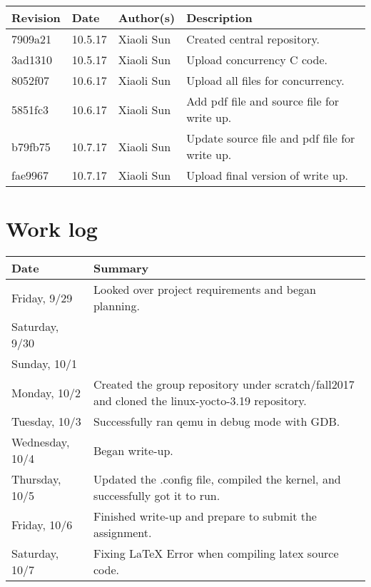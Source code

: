 \documentclass[10pt,letterpaper]{article}
\begin{document}
\begin{tabular}{|l|l|l|p{8cm}|} \hline
Revision & Date & Author(s) & Description\\ \hline
7909a21 & 10.5.17 & Xiaoli Sun & Created central repository.\\ \hline
3ad1310 & 10.5.17 & Xiaoli Sun & Upload concurrency C code.\\ \hline
8052f07 & 10.6.17 & Xiaoli Sun & Upload all files for concurrency.\\ \hline
5851fc3 & 10.6.17 & Xiaoli Sun & Add pdf file and source file for write up.\\ \hline
b79fb75 & 10.7.17 & Xiaoli Sun & Update source file and pdf file for write up.\\ \hline
fae9967 & 10.7.17 & Xiaoli Sun & Upload final version of write up.\\ \hline

\end{tabular}



\section{Work log}

\textbf{}

\begin{tabular}{|l|p{12cm}|} \hline
Date & Summary\\ \hline
Friday, 9/29 & Looked over project requirements and began planning.\\ \hline
Saturday, 9/30 &\\ \hline
Sunday, 10/1 &\\ \hline
Monday, 10/2 & Created the group repository under scratch/fall2017 and cloned the linux-yocto-3.19 repository. \\\hline
Tuesday, 10/3 &  Successfully ran qemu in debug mode with GDB. \\ \hline
Wednesday, 10/4 & Began write-up. \\ \hline
Thursday, 10/5 & Updated the .config file, compiled the kernel, and successfully got it to run. \\ \hline
Friday, 10/6 & Finished write-up and prepare to submit the assignment.\\ \hline
Saturday, 10/7 & Fixing LaTeX Error when compiling latex source code. \\ \hline

\end{tabular}
\end{document}
